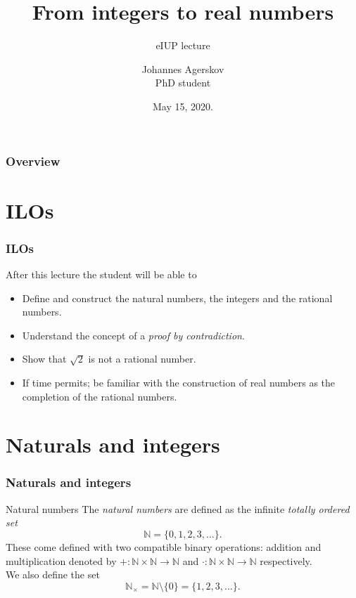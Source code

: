 \documentclass{beamer}[10]
\title{From integers to real numbers}
\subtitle{eIUP lecture}
\author{Johannes Agerskov\\
	\small{PhD student}}
\institute{Institute for Mathematical Sciences \\ University of Copenhagen}
\date{May 15, 2020.}
\begin{document}
\frame{\titlepage \vspace{-0.5cm}
}

\frame
{
\frametitle{Overview}
\linespread{1.5}
\tableofcontents%
}
\section{ILOs}
\begin{frame}
	\frametitle{ILOs}
	After this lecture the student will be able to
	\begin{itemize}
		\item Define and construct the natural numbers, the integers and the rational numbers.
		\item Understand the concept of a \emph{proof by contradiction}.
		\item Show that $ \sqrt{2} $ is not a rational number.
		\item If time permits; be familiar with the construction of real numbers as the completion of the rational numbers.
	\end{itemize}
\end{frame}

\section{Naturals and integers}
\begin{frame}
	\frametitle{Naturals and integers}
	\begin{block}{Natural numbers}
		The \emph{natural numbers} are defined as the infinite \emph{totally ordered set} \begin{equation}
		\mathbb{N}=\{0,1,2,3,...\}.
		\end{equation}
		These come defined with two compatible binary operations: addition and multiplication denoted by $ +:\mathbb{N}\times\mathbb{N}\to\mathbb{N} $ and $ \cdot:\mathbb{N}\times\mathbb{N}\to\mathbb{N} $ respectively.
		\pause\\
		We also define the set \begin{equation}
		\mathbb{N}_\times=\mathbb{N}\setminus\{0\}=\{1,2,3,...\}.
		\end{equation}
	\end{block}
\end{frame}
\end{document}
